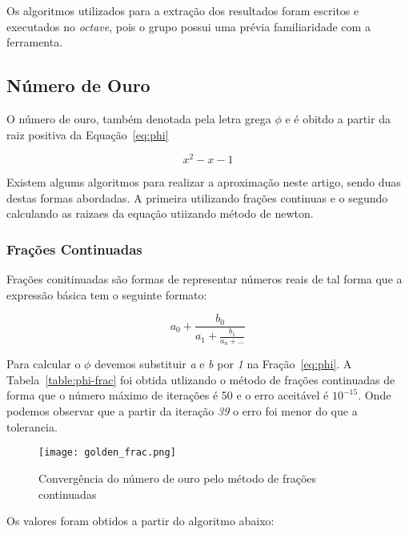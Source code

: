 	Os algoritmos utilizados para a extração dos resultados foram escritos e
	executados no \emph{octave}, pois o grupo possui uma prévia familiaridade
	com a ferramenta. 
	
	\subsection{Número de Ouro}
		
		O número de ouro, também denotada pela letra grega $\phi$ e é obitdo a
		partir da raiz positiva da Equação~\ref{eq:phi}

		\begin{equation}
			x^2-x-1
		\label{eq:phi}
		\end{equation}

		Existem algums algoritmos para realizar a aproximação neste artigo,
		sendo duas destas formas  abordadas. A primeira utilizando frações
		continuas e o segundo calculando as raizaes da equação utiizando método
		de newton.

		\subsubsection{Frações Continuadas}

			Frações conitinuadas são formas de representar números reais de tal
			forma que a expressão básica tem o seguinte formato:

			\begin{equation}
			\label{eq:phi-frac}
				a_0 + \frac{b_0}{a_1 + \frac{b_1}{a_n + \dots}}
			\end{equation}

			Para calcular o $\phi$ devemos substituir \emph{a} e \emph{b} por
			\emph{1} na Fração~\ref{eq:phi}. A Tabela~\ref{table:phi-frac} foi
			obtida utlizando o método de frações continuadas de forma que o
			número máximo de iterações é 50 e o erro aceitável é $10^{-15}$. Onde
			podemos observar que a partir da iteração \emph{39} o erro foi
			menor do que a tolerancia.

			


			\begin{figure}[H]
				\centering
				\texttt{[image: golden\_frac.png]}
				\caption{Convergência do número de ouro pelo método de frações continuadas}
				\label{golden_frac}
			\end{figure}


			Os valores foram obtidos a partir do algoritmo abaixo:

